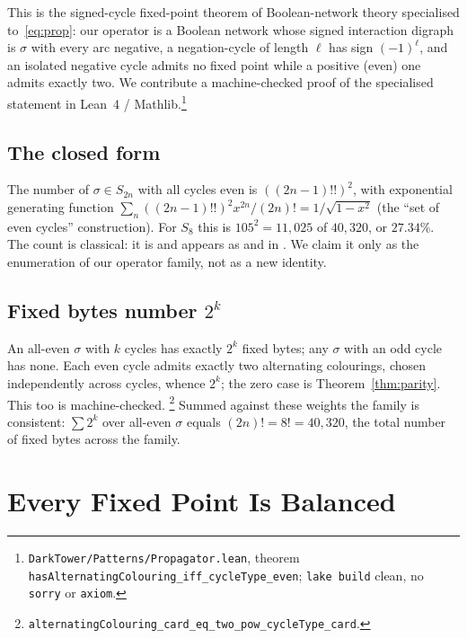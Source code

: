 \documentclass[man,12pt,floatsintext]{apa7}
\newcommand{\sig}{\sigma}
\begin{document}
This is the signed-cycle fixed-point theorem of Boolean-network theory
\parencite{aracena2008maximum} specialised to~\eqref{eq:prop}: our operator
is a Boolean network whose signed interaction digraph is $\sig$ with every
arc negative, a negation-cycle of length $\ell$ has sign $(-1)^\ell$, and
an isolated negative cycle admits no fixed point while a positive (even)
one admits exactly two. We contribute a machine-checked proof of the
specialised statement in Lean~4 / Mathlib.\footnote{%
\texttt{DarkTower/Patterns/Propagator.lean}, theorem
\texttt{hasAlternatingColouring\_iff\_cycleType\_even}; \texttt{lake build}
clean, no \texttt{sorry} or \texttt{axiom}.}

\subsection{The closed form}

The number of $\sig \in S_{2n}$ with all cycles even is $((2n-1)!!)^2$, with
exponential generating function $\sum_n ((2n-1)!!)^2 x^{2n}/(2n)! =
1/\sqrt{1-x^2}$ (the ``set of even cycles'' construction).
For $S_8$ this is $105^2 = 11{,}025$ of $40{,}320$, or $27.34\%$. The count
is classical: it is \textcite{oeis_a001818} and appears as
\textcite[Problem~5.34(c)]{stanley1999enumerative} and in
\textcite{riordan1968combinatorial}. We claim it only as the enumeration of
our operator family, not as a new identity.

\subsection{Fixed bytes number $2^k$}

An all-even $\sig$ with $k$ cycles has exactly $2^k$ fixed bytes; any
$\sig$ with an odd cycle has none. Each even cycle admits exactly two
alternating colourings, chosen independently across cycles, whence $2^k$;
the zero case is Theorem~\ref{thm:parity}. This too is machine-checked.%
\footnote{\texttt{alternatingColouring\_card\_eq\_two\_pow\_cycleType\_card}.}
Summed against these weights the family is consistent:
$\sum 2^{k}$ over all-even $\sig$ equals $(2n)! = 8! = 40{,}320$, the total
number of fixed bytes across the family.

\section{Every Fixed Point Is Balanced}
\label{sec:lambda}
\end{document}
